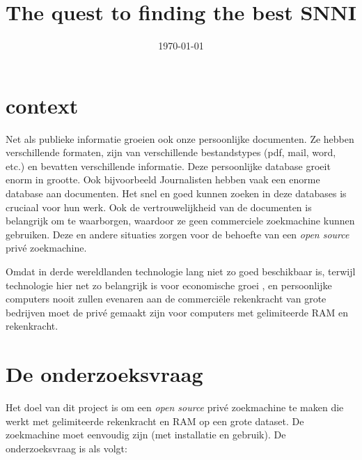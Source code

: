 \documentclass{uva-inf-article}
\title{The quest to finding the best SNNI}
\date{\today}
\begin{document}
\maketitle




\section{context}

Net als publieke informatie groeien ook onze persoonlijke documenten. Ze hebben verschillende formaten, zijn van verschillende bestandstypes (pdf, mail, word, etc.) en bevatten verschillende informatie. Deze persoonlijke database groeit enorm in grootte. Ook bijvoorbeeld Journalisten hebben vaak een enorme database aan documenten. Het snel en goed kunnen zoeken in deze databases is cruciaal voor hun werk. Ook de vertrouwelijkheid van de documenten is belangrijk om te waarborgen, waardoor ze geen commerciele zoekmachine kunnen gebruiken.  Deze en andere situaties zorgen voor de behoefte van een \textit{open source} privé zoekmachine. 

Omdat in derde wereldlanden technologie lang niet zo goed beschikbaar is, terwijl technologie hier net zo belangrijk is voor economische groei \parencite{Shahidullah2019}, en persoonlijke computers nooit zullen evenaren aan de commerciële rekenkracht van grote bedrijven moet de privé gemaakt zijn voor computers met gelimiteerde RAM en rekenkracht. 

\section{De onderzoeksvraag}
Het doel van dit project is om een \textit{open source} privé zoekmachine te maken die werkt met gelimiteerde rekenkracht en RAM op een grote dataset. De zoekmachine moet eenvoudig zijn (met installatie en gebruik). De onderzoeksvraag is als volgt: \paragraph{}
\end{document}

